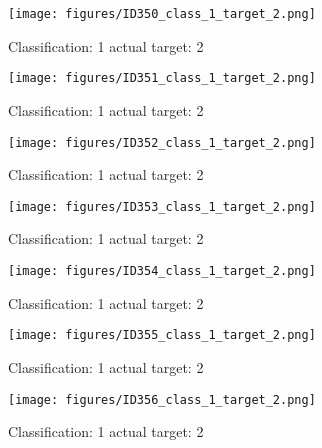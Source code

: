 \begin{figure}[h!]
\begin{center}
\texttt{[image: figures/ID350\_class\_1\_target\_2.png]}
\end{center}
\caption{ Classification: 1 actual target: 2}
\label{fig:ID350_class_1_target_2}
\end{figure}
\begin{figure}[h!]
\begin{center}
\texttt{[image: figures/ID351\_class\_1\_target\_2.png]}
\end{center}
\caption{ Classification: 1 actual target: 2}
\label{fig:ID351_class_1_target_2}
\end{figure}
\begin{figure}[h!]
\begin{center}
\texttt{[image: figures/ID352\_class\_1\_target\_2.png]}
\end{center}
\caption{ Classification: 1 actual target: 2}
\label{fig:ID352_class_1_target_2}
\end{figure}
\begin{figure}[h!]
\begin{center}
\texttt{[image: figures/ID353\_class\_1\_target\_2.png]}
\end{center}
\caption{ Classification: 1 actual target: 2}
\label{fig:ID353_class_1_target_2}
\end{figure}
\begin{figure}[h!]
\begin{center}
\texttt{[image: figures/ID354\_class\_1\_target\_2.png]}
\end{center}
\caption{ Classification: 1 actual target: 2}
\label{fig:ID354_class_1_target_2}
\end{figure}
\begin{figure}[h!]
\begin{center}
\texttt{[image: figures/ID355\_class\_1\_target\_2.png]}
\end{center}
\caption{ Classification: 1 actual target: 2}
\label{fig:ID355_class_1_target_2}
\end{figure}
\begin{figure}[h!]
\begin{center}
\texttt{[image: figures/ID356\_class\_1\_target\_2.png]}
\end{center}
\caption{ Classification: 1 actual target: 2}
\label{fig:ID356_class_1_target_2}
\end{figure}
